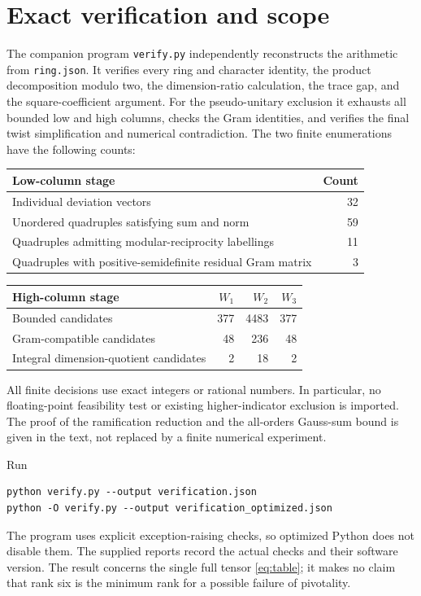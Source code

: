 \documentclass[11pt]{article}
\theoremstyle{remark}\newtheorem{remark}[theorem]{Remark}
\begin{document}
\section{Exact verification and scope}
The companion program \texttt{verify.py} independently reconstructs the arithmetic from \texttt{ring.json}. It verifies every ring and character identity, the product decomposition modulo two, the dimension-ratio calculation, the trace gap, and the square-coefficient argument. For the pseudo-unitary exclusion it exhausts all bounded low and high columns, checks the Gram identities, and verifies the final twist simplification and numerical contradiction. The two finite enumerations have the following counts:
\begin{center}
\begin{tabular}{lr}
\toprule
Low-column stage&Count\\\midrule
Individual deviation vectors&32\\
Unordered quadruples satisfying sum and norm&59\\
Quadruples admitting modular-reciprocity labellings&11\\
Quadruples with positive-semidefinite residual Gram matrix&3\\\bottomrule
\end{tabular}
\medskip

\begin{tabular}{lrrr}
\toprule
High-column stage&$W_1$&$W_2$&$W_3$\\\midrule
Bounded candidates&377&4483&377\\
Gram-compatible candidates&48&236&48\\
Integral dimension-quotient candidates&2&18&2\\\bottomrule
\end{tabular}
\end{center}
All finite decisions use exact integers or rational numbers. In particular, no floating-point feasibility test or existing higher-indicator exclusion is imported. The proof of the ramification reduction and the all-orders Gauss-sum bound is given in the text, not replaced by a finite numerical experiment.

Run
\begin{verbatim}
python verify.py --output verification.json
python -O verify.py --output verification_optimized.json
\end{verbatim}
The program uses explicit exception-raising checks, so optimized Python does not disable them. The supplied reports record the actual checks and their software version. The result concerns the single full tensor \eqref{eq:table}; it makes no claim that rank six is the minimum rank for a possible failure of pivotality.
\end{document}

